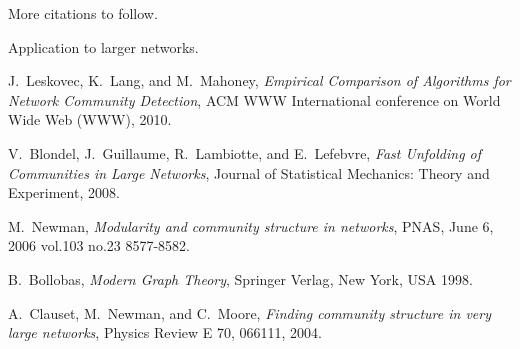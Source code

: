 \documentclass[conference]{IEEEtran}
\begin{document}
More citations to follow.

Application to larger networks.



%
%
%
\begin{thebibliography}{1}

J.~Leskovec, K.~Lang, and M.~Mahoney, \emph{Empirical Comparison of Algorithms for Network Community Detection}, { ACM WWW International conference on World Wide Web (WWW)}, 2010.

V.~Blondel, J.~Guillaume, R.~Lambiotte, and E.~Lefebvre, \emph{Fast Unfolding of Communities in Large Networks}, {Journal of Statistical Mechanics: Theory and Experiment}, 2008.

M.~Newman, \emph{Modularity and community structure in networks}, {PNAS}, June 6, 2006 vol.103 no.23 8577-8582.

B.~Bollobas, \emph{Modern Graph Theory}, {Springer Verlag}, New York, USA 1998.

A.~Clauset, M.~Newman, and C.~Moore, \emph{Finding community structure in very large networks}, {Physics Review} E 70, 066111, 2004.

\end{thebibliography}
\end{document}
